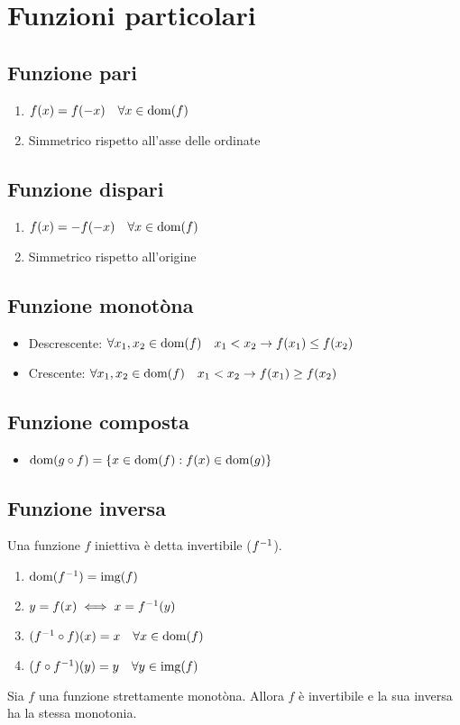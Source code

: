 \documentclass[12pt, a4paper]{report}
\begin{document}
    \section{Funzioni particolari}
    \subsection{Funzione pari}
    \begin{enumerate}
        \item $f(x)=f(-x) \quad \forall x \in \text{dom}(f)$
        \item Simmetrico rispetto all'asse delle ordinate
    \end{enumerate}
    \subsection{Funzione dispari}
    \begin{enumerate}
        \item $f(x)=-f(-x) \quad \forall x \in \text{dom}(f)$
        \item Simmetrico rispetto all'origine
    \end{enumerate}
    \subsection{Funzione monotòna}
    \begin{itemize}
        \item Descrescente: $\forall x_{1},x_{2} \in \text{dom}(f) \quad x_{1}<x_{2}\rightarrow f(x_{1})\leq f(x_{2})$
        \item Crescente: $\forall x_{1},x_{2} \in \text{dom}(f) \quad x_{1}<x_{2}\rightarrow f(x_{1})\geq f(x_{2})$
    \end{itemize}
    \subsection{Funzione composta}
    \begin{itemize}
        \item $\text{dom}(g\circ f)=\{x\in\text{dom}(f):f(x)\in \text{dom}(g)\}$ 
    \end{itemize}
    \subsection{Funzione inversa}
    Una funzione $f$ iniettiva è detta invertibile ($f^{-1}$).
    \begin{enumerate}
        \item $\text{dom}(f^{-1})=\text{img}(f)$
        \item $y=f(x) \iff x = f^{-1}(y)$
        \item $(f^{-1}\circ f)(x)=x \quad \forall x \in \text{dom}(f)$
        \item $(f\circ f^{-1})(y)=y \quad \forall y \in \text{img}(f)$
    \end{enumerate}
    Sia $f$ una funzione strettamente monotòna. Allora $f$ è invertibile e la sua inversa ha la stessa monotonia.
\end{document}
